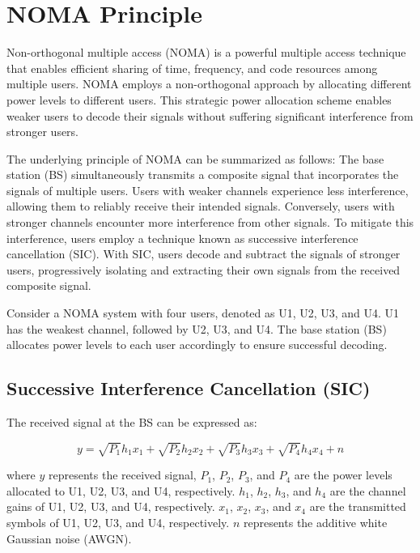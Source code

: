 \documentclass[conference]{IEEEtran}
\begin{document}
\section{NOMA Principle}
Non-orthogonal multiple access (NOMA) \cite{saito2013non} is a powerful multiple access technique that enables efficient sharing of time, frequency, and code resources among multiple users. NOMA employs a non-orthogonal approach by allocating different power levels to different users. This strategic power allocation scheme enables weaker users to decode their signals without suffering significant interference from stronger users.

The underlying principle of NOMA can be summarized as follows: The base station (BS) simultaneously transmits a composite signal that incorporates the signals of multiple users. Users with weaker channels experience less interference, allowing them to reliably receive their intended signals. Conversely, users with stronger channels encounter more interference from other signals. To mitigate this interference, users employ a technique known as successive interference cancellation (SIC). With SIC, users decode and subtract the signals of stronger users, progressively isolating and extracting their own signals from the received composite signal.

Consider a NOMA system with four users, denoted as U1, U2, U3, and U4. U1 has the weakest channel, followed by U2, U3, and U4. The base station (BS) allocates power levels to each user accordingly to ensure successful decoding.

\subsection{Successive Interference Cancellation (SIC)}

The received signal at the BS can be expressed as:

\begin{equation*}
y = \sqrt{P_1} h_1 x_1 + \sqrt{P_2} h_2 x_2 + \sqrt{P_3} h_3 x_3 + \sqrt{P_4} h_4 x_4 + n
\end{equation*}

where $y$ represents the received signal, $P_1$, $P_2$, $P_3$, and $P_4$ are the power levels allocated to U1, U2, U3, and U4, respectively. $h_1$, $h_2$, $h_3$, and $h_4$ are the channel gains of U1, U2, U3, and U4, respectively. $x_1$, $x_2$, $x_3$, and $x_4$ are the transmitted symbols of U1, U2, U3, and U4, respectively. $n$ represents the additive white Gaussian noise (AWGN).
\end{document}
